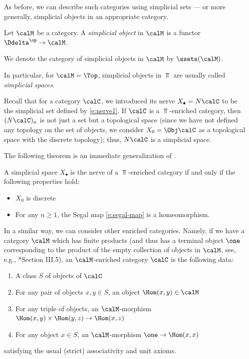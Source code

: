 As before, we can describe such categories using simplicial sets --- or more
generally, simplicial objects in an appropriate category.


\begin{definition}\label{d:simplicial-object}
  Let $\calM$ be a category. A \emph{simplicial object} in $\calM$
  is a functor $\Ddelta^\op\to \calM$.

  We denote the category of simplicial objects in $\calM$ by $\ssets(\calM)$.
\end{definition}
In particular, for $\calM=\Top$, simplicial objects in $\Top$
are usually called \emph{simplicial spaces}.

Recall that for a category $\calC$, we introduced its nerve $X_\bullet
=N\calC$ to be the simplicial set defined by \eqref{e:nerve1}. If $\calC$
is a $\Top$-enriched category, then $(N\calC)_n$ is not just a set but a
topological space (since we have not defined any topology on the set of
objects, we consider $X_0=\Obj \calC$ as a topological space with the discrete
topology); thus, $N\calC$ is a simplicial space.


The following theorem is an immediate generalization of .
\begin{theorem}\label{t:nerve-characterization}
  A simplicial space $X_\bullet$ is the nerve of a $\Top$-enriched
  category if and only if the following properties hold:
  \begin{itemize}
    \item $X_0$ is discrete
    \item For any $n\ge 1$, the Segal map \eqref{e:segal-map} is a homeomorphism.
  \end{itemize}
\end{theorem}





In a similar way, we can consider other enriched categories. Namely, if we have
a category $\calM$ which has finite products (and thus has a terminal object
$\one$ corresponding to the product of the empty collection of objects in $\calM$, see,
e.g., *{Section III.5}), an $\calM$-enriched category
$\calC$ is the following data:

\begin{enumerate}
\item A class $S$ of objects of $\calC$
\item For any pair of objects $x,y\in S$, an object
  $\Hom(x,y)\in \calM$
\item For any triple of objects, an $\calM$-morphism
      $\Hom(x,y)\times \Hom(y,z)\to \Hom(x,z)$
\item For any object $x\in S$, an $\calM$-morphism $\one \to \Hom(x,x)$
\end{enumerate}
satisfying the usual (strict) associativity and unit axioms.


